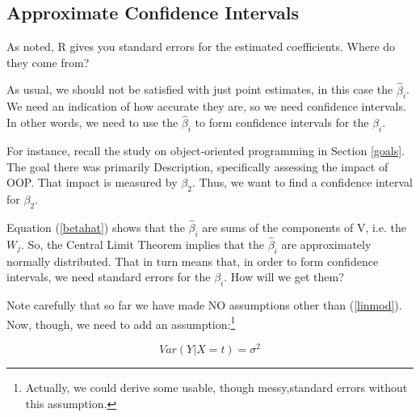 % 
% 
% 
% 
% 

\subsection{Approximate Confidence Intervals}
\label{regappcis}

As noted, R gives you standard errors for the estimated coefficients.
Where do they come from?

As usual, we should not be satisfied with just point estimates, in this
case the $\widehat{\beta}_i$.  We need an indication of how accurate
they are, so we need confidence intervals.  In other words, we need to
use the $\widehat{\beta}_i$ to form confidence intervals for the
$\beta_i$.

For instance, recall the study on object-oriented programming in Section
\ref{goals}.  The goal there was primarily Description, specifically
assessing the impact of OOP.  That impact is measured by $\beta_2$.
Thus, we want to find a confidence interval for $\beta_2$.

Equation (\ref{betahat}) shows that the $\widehat{\beta}_i$ are sums of
the components of V, i.e. the $W_j$.  So, the Central Limit Theorem
implies that the $\widehat{\beta}_i$ are approximately normally
distributed.  That in turn means that, in order to form confidence
intervals, we need standard errors for the $\beta_i$.  How will we get
them?

Note carefully that so far we have made NO assumptions other than
(\ref{linmod}).  Now, though, we need to add an
assumption:\footnote{Actually, we could derive some usable, though
messy,standard errors without this assumption.}

\begin{equation}
\label{hmsced}
Var(Y|X=t) = \sigma^2 
\end{equation}

